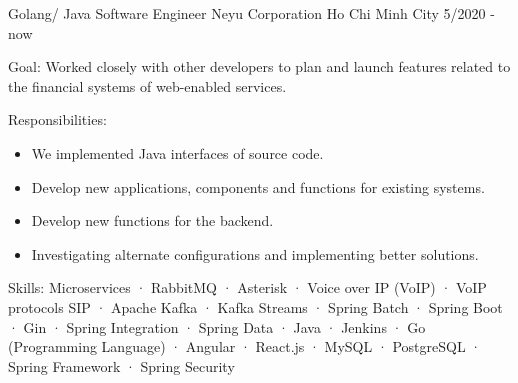  \cventry
    {Golang/ Java Software Engineer} %
    {Neyu Corporation} %
    {Ho Chi Minh City} %
    {5/2020 - now} %
    {
      \begin{cvitems} %
        \item {Goal: Worked closely with other developers to plan and launch features related to the financial systems of web-enabled services.}
        \item {Responsibilities: }
        {
            \begin{itemize} %
                \item {We implemented Java interfaces of source code.}
                \item {Develop new applications, components and functions for existing systems.}
                \item {Develop new functions for the backend.}
                \item {Investigating alternate configurations and implementing better solutions.}
            \end{itemize}
        }
        \item {Skills: Microservices · RabbitMQ · Asterisk · Voice over IP (VoIP) · VoIP protocols SIP · Apache Kafka · Kafka Streams · Spring Batch · Spring Boot · Gin · Spring Integration · Spring Data · Java · Jenkins · Go (Programming Language) · Angular · React.js · MySQL · PostgreSQL · Spring Framework · Spring Security}
      \end{cvitems}
    }